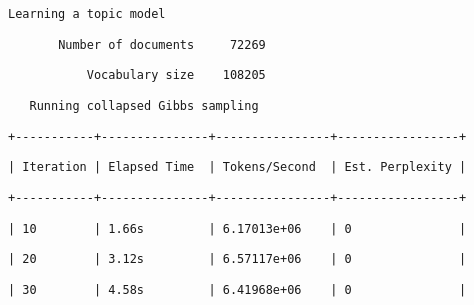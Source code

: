 \documentclass[11pt]{ctexart}
\begin{document}
    
    \begin{verbatim}
Learning a topic model
    \end{verbatim}

    
    
    \begin{verbatim}
       Number of documents     72269
    \end{verbatim}

    
    
    \begin{verbatim}
           Vocabulary size    108205
    \end{verbatim}

    
    
    \begin{verbatim}
   Running collapsed Gibbs sampling
    \end{verbatim}

    
    
    \begin{verbatim}
+-----------+---------------+----------------+-----------------+
    \end{verbatim}

    
    
    \begin{verbatim}
| Iteration | Elapsed Time  | Tokens/Second  | Est. Perplexity |
    \end{verbatim}

    
    
    \begin{verbatim}
+-----------+---------------+----------------+-----------------+
    \end{verbatim}

    
    
    \begin{verbatim}
| 10        | 1.66s         | 6.17013e+06    | 0               |
    \end{verbatim}

    
    
    \begin{verbatim}
| 20        | 3.12s         | 6.57117e+06    | 0               |
    \end{verbatim}

    
    
    \begin{verbatim}
| 30        | 4.58s         | 6.41968e+06    | 0               |
    \end{verbatim}

    
    
\end{document}
